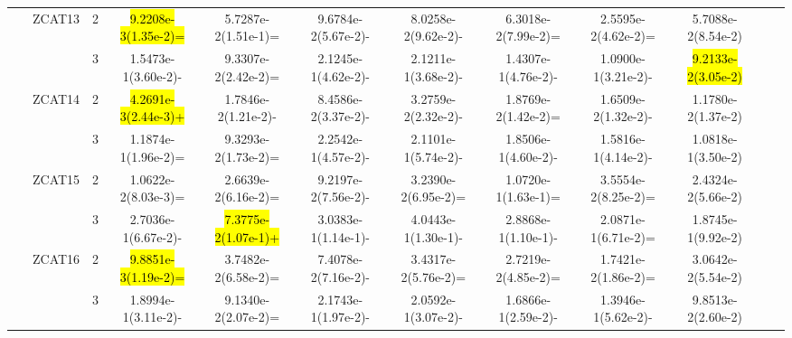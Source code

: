 \documentclass[a4paper,fleqn]{cas-dc}
\newcommand{\highlight}[1]{
	\begingroup
	\sethlcolor{Seashell}%
	\hl{#1}%
	\endgroup
}
\begin{document}
\begin{sloppypar}
\begin{table}[ht]
{\begin{tabular}{cccccccccccc}
					
					
					
					\multirow{6}{*}{~}&\multirow{2}{*}{ZCAT13}&2 &\highlight{9.2208e-3(1.35e-2)=}	&5.7287e-2(1.51e-1)=	&9.6784e-2(5.67e-2)-	&8.0258e-2(9.62e-2)-	&6.3018e-2(7.99e-2)=	&2.5595e-2(4.62e-2)=	&5.7088e-2(8.54e-2)\\
					
					
					
					
					
					
					\multirow{6}{*}{~}&\multirow{2}{*}{~}&3		&1.5473e-1(3.60e-2)-	&9.3307e-2(2.42e-2)=	&2.1245e-1(4.62e-2)-	&2.1211e-1(3.68e-2)-	&1.4307e-1(4.76e-2)-	&1.0900e-1(3.21e-2)-	&\highlight{9.2133e-2(3.05e-2)}\\
					\hline
					
					
					
					
					
					
					
					
					
					\multirow{2}{*}{Degenerated}&\multirow{2}{*}{ZCAT14}&2 &\highlight{4.2691e-3(2.44e-3)+} &1.7846e-2(1.21e-2)-	&8.4586e-2(3.37e-2)-	&3.2759e-2(2.32e-2)-	&1.8769e-2(1.42e-2)=	&1.6509e-2(1.32e-2)-	&1.1780e-2(1.37e-2)\\
					
					\multirow{2}{*}{~}&\multirow{2}{*}{~}&3 &1.1874e-1(1.96e-2)= &9.3293e-2(1.73e-2)=	&2.2542e-1(4.57e-2)-	&2.1101e-1(5.74e-2)-	&1.8506e-1(4.60e-2)-	&1.5816e-1(4.14e-2)-	&1.0818e-1(3.50e-2)\\
					\hline
					
					
					\multirow{12}{*}{Mixed}&\multirow{2}{*}{ZCAT15}&2 &1.0622e-2(8.03e-3)= &2.6639e-2(6.16e-2)=	&9.2197e-2(7.56e-2)-	&3.2390e-2(6.95e-2)=	&1.0720e-1(1.63e-1)=	&3.5554e-2(8.25e-2)=	&2.4324e-2(5.66e-2)\\
					
					
					\multirow{12}{*}{~}&\multirow{2}{*}{~}&3 &2.7036e-1(6.67e-2)-	&\highlight{7.3775e-2(1.07e-1)+}	&3.0383e-1(1.14e-1)-	&4.0443e-1(1.30e-1)-	&2.8868e-1(1.10e-1)-	&2.0871e-1(6.71e-2)=	&1.8745e-1(9.92e-2)\\
					
					
					
					
					
					
					\multirow{12}{*}{~}&\multirow{2}{*}{ZCAT16}&2 &\highlight{9.8851e-3(1.19e-2)=}	&3.7482e-2(6.58e-2)=	&7.4078e-2(7.16e-2)-	&3.4317e-2(5.76e-2)=	&2.7219e-2(4.85e-2)=	&1.7421e-2(1.86e-2)=	&3.0642e-2(5.54e-2)\\
					
					\multirow{12}{*}{~}&\multirow{2}{*}{~}&3	&1.8994e-1(3.11e-2)-	&9.1340e-2(2.07e-2)=	&2.1743e-1(1.97e-2)-	&2.0592e-1(3.07e-2)-	&1.6866e-1(2.59e-2)-	&1.3946e-1(5.62e-2)-	&9.8513e-2(2.60e-2)\\
					

\end{tabular}}
\end{table}
\end{sloppypar}
\end{document}
